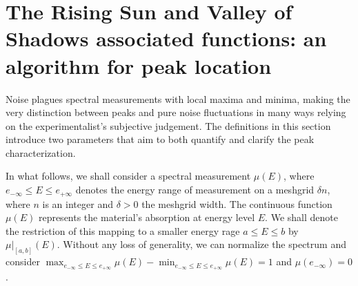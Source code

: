 \documentclass[%
 reprint,
 amsmath,amssymb,
 aps,
]{revtex4-1}
\begin{document}
 \section*{The Rising Sun and Valley of Shadows associated functions: an algorithm for peak location}\label{sec:rising_sun} Noise plagues spectral measurements with local maxima and minima, making the very distinction between  peaks and %
pure noise fluctuations in many ways relying on the experimentalist's subjective judgement. The  definitions in this section introduce two parameters that aim to both quantify and clarify the peak characterization. 

In what follows, we shall consider a spectral measurement $\mu(E)$, where $e_{-\infty}\leq E\leq e_{+\infty}$ denotes the energy range of measurement on a meshgrid $\delta n$, where $n$ is an integer and $\delta>0$ the meshgrid width. The continuous function $\mu(E)$
represents the material's absorption at energy level $E$. %
We shall denote the restriction of this mapping to a smaller energy rage $a\leq E \leq b$ by $\mu\Big|_{[a,b]}(E)$. Without any loss of generality, we can normalize the spectrum and consider $\displaystyle{\max_{e_{-\infty}\leq E\leq e_{+\infty}}\mu(E) - \min_{e_{-\infty}\leq E\leq e_{+\infty}}\mu(E)=1}$ and $\mu(e_{-\infty})=0$.
\end{document}
